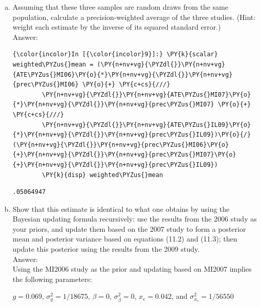 \documentclass[11pt,notitlepage]{article}\usepackage[]{graphicx}\usepackage[]{color}
\makeatletter
\newenvironment{kframe}{%
 \def\at@end@of@kframe{}%
 \ifinner\ifhmode%
  \def\at@end@of@kframe{\end{minipage}}%
  \begin{minipage}{\columnwidth}%
 \fi\fi%
 \def\FrameCommand##1{\hskip\@totalleftmargin \hskip-\fboxsep
 \colorbox{shadecolor}{##1}\hskip-\fboxsep
     \hskip-\linewidth \hskip-\@totalleftmargin \hskip\columnwidth}%
 \MakeFramed {\advance\hsize-\width
   \@totalleftmargin\z@ \linewidth\hsize
   \@setminipage}}%
 {\par\unskip\endMakeFramed%
 \at@end@of@kframe}
\newenvironment{knitrout}{}{} %
\makeatother
\begin{document}
\begin{enumerate}[a)]
\item Assuming that these three samples are random draws from the same population, calculate a precision-weighted average of the three studies. (Hint: weight each estimate by the inverse of its squared standard error.)\\
Answer:\\

\begin{knitrout}
\color{fgcolor}\begin{kframe}

    \begin{Verbatim}[commandchars=\\\{\}]
{\color{incolor}In [{\color{incolor}9}]:} \PY{k}{scalar} weighted\PYZus{}mean = (\PY{n+nv+vg}{\PYZdl{}}\PY{n+nv+vg}{ATE\PYZus{}MI06}\PY{o}{*}\PY{n+nv+vg}{\PYZdl{}}\PY{n+nv+vg}{prec\PYZus{}MI06} \PY{o}{+} \PY{c+cs}{///}
        \PY{n+nv+vg}{\PYZdl{}}\PY{n+nv+vg}{ATE\PYZus{}MI07}\PY{o}{*}\PY{n+nv+vg}{\PYZdl{}}\PY{n+nv+vg}{prec\PYZus{}MI07} \PY{o}{+} \PY{c+cs}{///}
        \PY{n+nv+vg}{\PYZdl{}}\PY{n+nv+vg}{ATE\PYZus{}IL09}\PY{o}{*}\PY{n+nv+vg}{\PYZdl{}}\PY{n+nv+vg}{prec\PYZus{}IL09})\PY{o}{/}(\PY{n+nv+vg}{\PYZdl{}}\PY{n+nv+vg}{prec\PYZus{}MI06}\PY{o}{+}\PY{n+nv+vg}{\PYZdl{}}\PY{n+nv+vg}{prec\PYZus{}MI07}\PY{o}{+}\PY{n+nv+vg}{\PYZdl{}}\PY{n+nv+vg}{prec\PYZus{}IL09})
        \PY{k}{disp} weighted\PYZus{}mean
\end{Verbatim}

    \begin{Verbatim}[commandchars=\\\{\}]
.05064947

    \end{Verbatim}
\end{kframe}
\end{knitrout}


\item Show that this estimate is identical to what one obtains by using the Bayesian updating formula recursively: use the results from the 2006 study as your priors, and update them based on the 2007 study to form a posterior mean and posterior variance based on equations (11.2) and (11.3); then update this posterior using the results from the 2009 study.\\
Answer:\\

Using the MI2006 study as the prior and updating based on MI2007 implies the following parameters:

$g=0.069$, $\sigma^2_g = 1/18675$, $\beta = 0$, $\sigma^2_{\beta} = 0$, $x_e = 0.042$, and $\sigma^2_{x_e} = 1/56550$


\end{enumerate}
\end{document}
